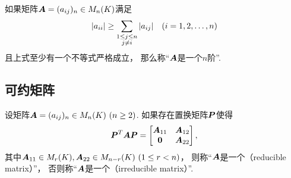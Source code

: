 \begin{definition}
如果矩阵\(\boldsymbol{A}=(a_{ij})_n \in M_n(K)\)满足\begin{equation*}
	\abs{a_{ii}} \geq \sum_{\substack{1 \leq j \leq n \\ j \neq i}} \abs{a_{ij}}
	\quad (i=1,2,\dotsc,n)
\end{equation*}
且上式至少有一个不等式严格成立，
那么称“\(\boldsymbol{A}\)是一个\(n\)阶”.
\end{definition}

\subsection{可约矩阵}
\begin{definition}
设矩阵\(\boldsymbol{A} = (a_{ij})_n \in M_n(K)\ (n\geq2)\).
如果存在置换矩阵\(\boldsymbol{P}\)使得\begin{equation*}
	\boldsymbol{P}^T \boldsymbol{A} \boldsymbol{P}
	= \begin{bmatrix}
		\boldsymbol{A}_{11} & \boldsymbol{A}_{12} \\
		\boldsymbol0 & \boldsymbol{A}_{22} \\
	\end{bmatrix},
\end{equation*}
其中\(
	\boldsymbol{A}_{11} \in M_r(K),
	\boldsymbol{A}_{22} \in M_{n-r}(K)
	\ (1 \leq r < n)
\)，
则称“\(\boldsymbol{A}\)是一个（reducible matrix）”，
否则称“\(\boldsymbol{A}\)是一个（irreducible matrix）”.
\end{definition}
